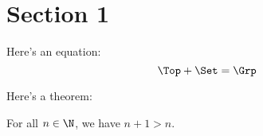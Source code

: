 \documentclass[wip, topology, algebra, nocolor]{bsteffan-lecturenotes}
\subtitle{The Serre Spectral Sequence, Characteristic Classes, and Bordism}
\author{Ben Steffan}
\begin{document}
\maketitle
\tableofcontents

\section{Section 1}
\lipsum

Here's an equation:
\begin{equation*}
	\Top + \Set = \Grp
\end{equation*}

Here's a theorem:
\begin{theorem}
	For all $n \in \N$, we have $n + 1 > n$.
\end{theorem}
\end{document}
